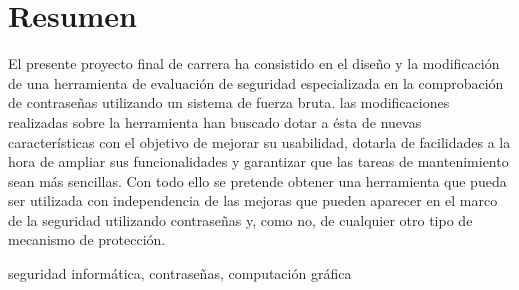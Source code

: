\section*{Resumen}

El presente proyecto final de carrera ha consistido en el diseño y la modificación de una herramienta de evaluación de seguridad especializada en la comprobación de contraseñas utilizando un sistema de fuerza bruta. las modificaciones realizadas sobre la herramienta han buscado dotar a ésta de nuevas características con el objetivo de mejorar su usabilidad, dotarla de facilidades a la hora de ampliar sus funcionalidades y garantizar que las tareas de mantenimiento sean más sencillas. Con todo ello se pretende obtener una herramienta que pueda ser utilizada con independencia de las mejoras que pueden aparecer en el marco de la seguridad utilizando contraseñas y, como no, de cualquier otro tipo de mecanismo de protección.

\begin{keywords}
seguridad informática, contraseñas, computación gráfica
\end{keywords}
